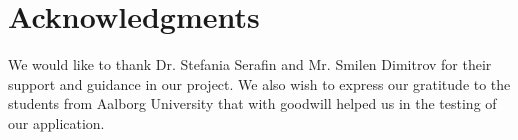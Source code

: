 \documentclass[journal]{IEEEtran}
\begin{document}
\section*{Acknowledgments}

We would like to thank Dr. Stefania Serafin and Mr. Smilen Dimitrov for their support and guidance in our project. We also wish to express our gratitude to the students from Aalborg University that with goodwill helped us in the testing of our application.
















%
%
%
%
%
\end{document}
